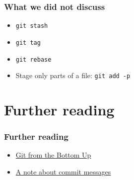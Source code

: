 \documentclass{gittalk}
\newcommand{\hlcommand}[1]{%
\colorbox{base3}{\small \texttt{#1}}
}
\begin{document}
\begin{frame}
\frametitle{What we did not discuss}
\begin{itemize}
  \item \hlcommand{git stash}
  \item \hlcommand{git tag}
  \item \hlcommand{git rebase}
  \item Stage only parts of a file: \texttt{git add -p}
\end{itemize}
\end{frame}

\section{Further reading}

\begin{frame}
\frametitle{Further reading}
\begin{itemize}
    \item \href{http://jwiegley.github.io/git-from-the-bottom-up/}{Git from the Bottom Up}
    \item \href{http://tbaggery.com/2008/04/19/a-note-about-git-commit-messages.html}
               {A note about commit messages}
\end{itemize}
\end{frame}
\end{document}
